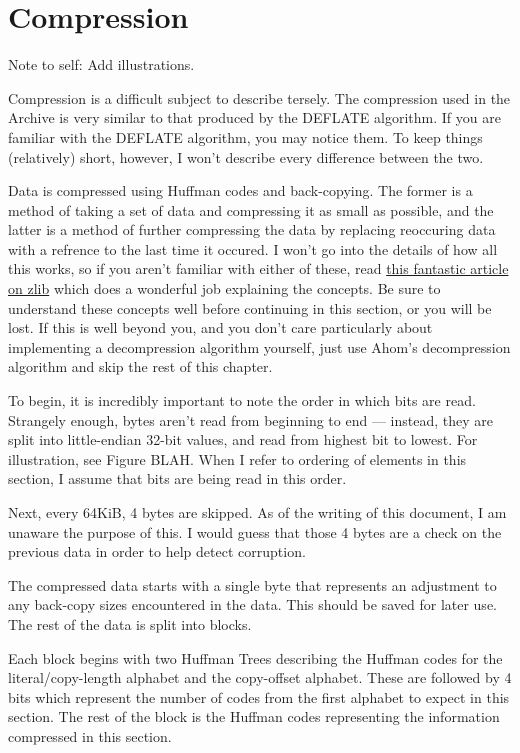 \section{Compression}
\label{sec:compression}

Note to self: Add illustrations.

Compression is a difficult subject to describe tersely.  The compression used in
the Archive is very similar to that produced by the DEFLATE algorithm.  If you
are familiar with the DEFLATE algorithm, you may notice them.  To keep things
(relatively) short, however, I won't describe every difference between the two.

Data is compressed using Huffman codes and back-copying.  The former is a method
of taking a set of data and compressing it as small as possible, and the latter
is a method of further compressing the data by replacing reoccuring data with a
refrence to the last time it occured.  I won't go into the details of how all
this works, so if you aren't familiar with either of these, read
\href{http://zlib.net/feldspar.html}{this fantastic article on zlib} which does
a wonderful job explaining the concepts.  Be sure to understand these concepts
well before continuing in this section, or you will be lost.  If this is well
beyond you, and you don't care particularly about implementing a decompression
algorithm yourself, just use Ahom's decompression algorithm and skip the rest
of this chapter.

To begin, it is incredibly important to note the order in which bits are read.
Strangely enough, bytes aren't read from beginning to end --- instead, they
are split into little-endian 32-bit values, and read from highest bit to lowest.
For illustration, see Figure BLAH.  When I refer to ordering of elements in this
section, I assume that bits are being read in this order.

Next, every 64KiB, 4 bytes are skipped.  As of the writing of this document, I
am unaware the purpose of this.  I would guess that those 4 bytes are a check
on the previous data in order to help detect corruption.

The compressed data starts with a single byte that represents an adjustment to
any back-copy sizes encountered in the data.  This should be saved for later
use.  The rest of the data is split into blocks.

Each block begins with two Huffman Trees describing the Huffman codes for the
literal/copy-length alphabet and the copy-offset alphabet. These are followed
by 4 bits which represent the number of codes from the first alphabet to expect
in this section. The rest of the block is the Huffman codes representing the
information compressed in this section.

